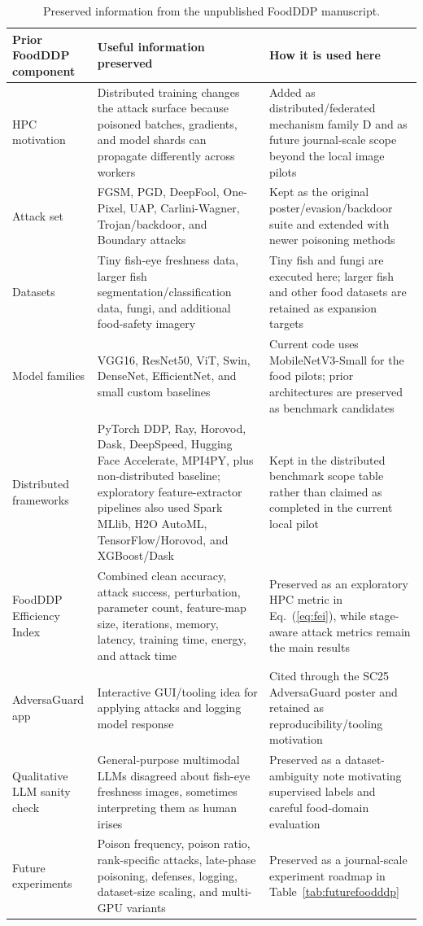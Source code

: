 ﻿\documentclass[6p,10pt,times]{ieeeaccess}
\begin{document}
\begin{table}[t]
\centering
\caption{Preserved information from the unpublished FoodDDP manuscript.}
\label{tab:foodddpmap}
\small
\begin{tabular}{p{}p{}p{}}
\toprule
Prior FoodDDP component & Useful information preserved & How it is used here \\
\midrule
HPC motivation & Distributed training changes the attack surface because poisoned batches, gradients, and model shards can propagate differently across workers & Added as distributed/federated mechanism family D and as future journal-scale scope beyond the local image pilots \\
Attack set & FGSM, PGD, DeepFool, One-Pixel, UAP, Carlini-Wagner, Trojan/backdoor, and Boundary attacks & Kept as the original poster/evasion/backdoor suite and extended with newer poisoning methods \\
Datasets & Tiny fish-eye freshness data, larger fish segmentation/classification data, fungi, and additional food-safety imagery & Tiny fish and fungi are executed here; larger fish and other food datasets are retained as expansion targets \\
Model families & VGG16, ResNet50, ViT, Swin, DenseNet, EfficientNet, and small custom baselines & Current code uses MobileNetV3-Small for the food pilots; prior architectures are preserved as benchmark candidates \\
Distributed frameworks & PyTorch DDP, Ray, Horovod, Dask, DeepSpeed, Hugging Face Accelerate, MPI4PY, plus non-distributed baseline; exploratory feature-extractor pipelines also used Spark MLlib, H2O AutoML, TensorFlow/Horovod, and XGBoost/Dask & Kept in the distributed benchmark scope table rather than claimed as completed in the current local pilot \\
FoodDDP Efficiency Index & Combined clean accuracy, attack success, perturbation, parameter count, feature-map size, iterations, memory, latency, training time, energy, and attack time & Preserved as an exploratory HPC metric in Eq.~(\ref{eq:fei}), while stage-aware attack metrics remain the main results \\
AdversaGuard app & Interactive GUI/tooling idea for applying attacks and logging model response & Cited through the SC25 AdversaGuard poster and retained as reproducibility/tooling motivation \\
Qualitative LLM sanity check & General-purpose multimodal LLMs disagreed about fish-eye freshness images, sometimes interpreting them as human irises & Preserved as a dataset-ambiguity note motivating supervised labels and careful food-domain evaluation \\
Future experiments & Poison frequency, poison ratio, rank-specific attacks, late-phase poisoning, defenses, logging, dataset-size scaling, and multi-GPU variants & Preserved as a journal-scale experiment roadmap in Table~\ref{tab:futurefoodddp} \\
\bottomrule
\end{tabular}
\end{table}
\end{document}
